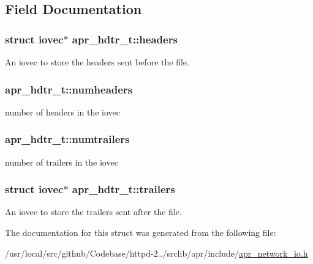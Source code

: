 \subsection{Field Documentation}
\subsubsection[{\texorpdfstring{headers}{headers}}]{\setlength{\rightskip}{0pt plus 5cm}struct iovec$\ast$ apr\+\_\+hdtr\+\_\+t\+::headers}\hypertarget{structapr__hdtr__t_afc2035a3ef314f9aa6ae3aabe7c0dc72}{}\label{structapr__hdtr__t_afc2035a3ef314f9aa6ae3aabe7c0dc72}
An iovec to store the headers sent before the file. 
\subsubsection[{\texorpdfstring{numheaders}{numheaders}}]{ apr\+\_\+hdtr\+\_\+t\+::numheaders}\hypertarget{structapr__hdtr__t_a8915ade68ef06f4d23005ec0f81e9305}{}\label{structapr__hdtr__t_a8915ade68ef06f4d23005ec0f81e9305}
number of headers in the iovec 
\subsubsection[{\texorpdfstring{numtrailers}{numtrailers}}]{ apr\+\_\+hdtr\+\_\+t\+::numtrailers}\hypertarget{structapr__hdtr__t_a9468659de891a5672b0b84cf442e9c7b}{}\label{structapr__hdtr__t_a9468659de891a5672b0b84cf442e9c7b}
number of trailers in the iovec 
\subsubsection[{\texorpdfstring{trailers}{trailers}}]{\setlength{\rightskip}{0pt plus 5cm}struct iovec$\ast$ apr\+\_\+hdtr\+\_\+t\+::trailers}\hypertarget{structapr__hdtr__t_a538387cfa0065abc2bfa6ba7393fa3ee}{}\label{structapr__hdtr__t_a538387cfa0065abc2bfa6ba7393fa3ee}
An iovec to store the trailers sent after the file. 

The documentation for this struct was generated from the following file\+:\begin{DoxyCompactItemize}
\item 
/usr/local/src/github/\+Codebase/httpd-\/2../srclib/apr/include/\hyperlink{apr__network__io_8h}{apr\+\_\+network\+\_\+io.\+h}\end{DoxyCompactItemize}
